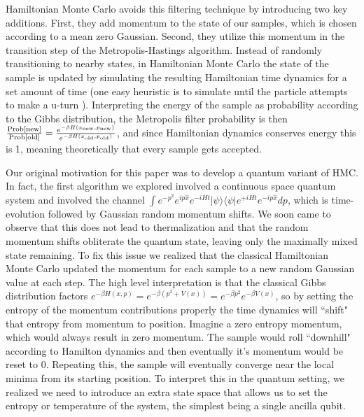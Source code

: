 \documentclass{article}
\newcommand{\ketbra}[2]{| #1\rangle\! \langle #2|}
\newcommand{\prob}[1]{{\rm Prob}\left[ #1 \right]}
\begin{document}
Hamiltonian Monte Carlo avoids this filtering technique by introducing two key additions. First, they add momentum to the state of our samples, which is chosen according to a mean zero Gaussian. Second, they utilize this momentum in the transition step of the Metropolis-Hastings algorithm. Instead of randomly transitioning to nearby states, in Hamiltonian Monte Carlo the state of the sample is updated by simulating the resulting Hamiltonian time dynamics for a set amount of time (one easy heuristic is to simulate until the particle attempts to make a u-turn \cite{hoffman2011nouturnsampleradaptivelysetting}). Interpreting the energy of the sample as probability according to the Gibbs distribution, the Metropolis filter probability is then $\frac{\prob{\text{new}}}{\prob{\text{old}}} = \frac{e^{-\beta H(x_{\text{new}}, p_{\text{new}}) }}{e^{-\beta H(x_{\text{old}}, p_{\text{old}}) }}$, and since Hamiltonian dynamics conserves energy this is 1, meaning theoretically that every sample gets accepted.

Our original motivation for this paper was to develop a quantum variant of HMC. In fact, the first algorithm we explored involved a continuous space quantum system and involved the channel $\int e^{- p^2} e^{i p \hat{x}} e^{-i H t} \ketbra{\psi}{\psi} e^{+ i H t} e^{-i p \hat{x}} dp$, which is time-evolution followed by Gaussian random momentum shifts. We soon came to observe that this does not lead to thermalization and that the random momentum shifts obliterate the quantum state, leaving only the maximally mixed state remaining. To fix this issue we realized that the classical Hamiltonian Monte Carlo updated the momentum for each sample to a new random Gaussian value at each step. The high level interpretation is that the classical Gibbs distribution factors $e^{-\beta H(x, p)} = e^{-\beta (p^2 + V(x))} = e^{-\beta p^2} e^{-\beta V(x)}$, so by setting the entropy of the momentum contributions properly the time dynamics will ``shift" that entropy from momentum to position. Imagine a zero entropy momentum, which would always result in zero momentum. The sample would roll ``downhill" according to Hamilton dynamics and then eventually it's momentum would be reset to 0. Repeating this, the sample will eventually converge near the local minima from its starting position. To interpret this in the quantum setting, we realized we need to introduce an extra state space that allows us to set the entropy or temperature of the system, the simplest being a single ancilla qubit.
\end{document}
